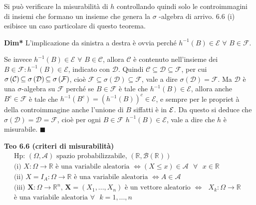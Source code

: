 \documentclass{article}
\begin{document}
Si pu\`{o} verificare la misurabilit\`{a} di $h$ controllando quindi solo le
controimmagini di insiemi che formano un insieme che genera la $\sigma $%
-algebra di arrivo. 6.6 (i) esibisce un caso particolare di questo teorema.

\textbf{Dim*} L'implicazione da sinistra a destra \`{e} ovvia perch\'{e} $%
h^{-1}\left( B\right) \in \mathcal{E}$ $\forall $ $B\in \mathcal{F}$.

Se invece $h^{-1}\left( B\right) \in \mathcal{E}$ $\forall $ $B\in \mathcal{C%
}$, allora $\mathcal{C}$ \`{e} contenuto nell'insieme dei $B\in \mathcal{F}%
:h^{-1}\left( B\right) \in \mathcal{E}$, indicato con $\mathcal{D}$. Quindi $%
\mathcal{C\subseteq D\subseteq F}$, per cui $\sigma \left( \mathcal{C}%
\right) \mathcal{\subseteq \sigma }\left( \mathcal{D}\right) \mathcal{%
\subseteq \sigma }\left( \mathcal{F}\right) $, cio\`{e} $\mathcal{F\subseteq
\sigma }\left( \mathcal{D}\right) \mathcal{\subseteq F}$, vale a dire $%
\mathcal{\sigma }\left( \mathcal{D}\right) =\mathcal{F}$. Ma $\mathcal{D}$ 
\`{e} una $\sigma $-algebra su $\mathcal{F}$ perch\'{e} se $B\in \mathcal{F}$
\`{e} tale che $h^{-1}\left( B\right) \in \mathcal{E}$, allora anche $%
B^{c}\in \mathcal{F}$ \`{e} tale che $h^{-1}\left( B^{c}\right) =\left(
h^{-1}\left( B\right) \right) ^{c}\in \mathcal{E}$, e sempre per le propriet%
\`{a} della controimmagine anche l'unione di $B$ siffatti \`{e} in $\mathcal{%
E}$. Da questo si deduce che $\mathcal{\sigma }\left( \mathcal{D}\right) =%
\mathcal{D}=\mathcal{F}$, cio\`{e} per ogni $B\in \mathcal{F}$ $h^{-1}\left(
B\right) \in \mathcal{E}$, vale a dire che $h$ \`{e} misurabile. $%
\blacksquare $

\textbf{Teo 6.6 (criteri di misurabilit\`{a})}%
\begin{gather*}
\text{Hp: }\left( \Omega ,\mathcal{A}\right) \text{ spazio probabilizzabile, 
}\left( 
\mathbb{R}
,\mathcal{B}\left( 
\mathbb{R}
\right) \right) \\
\text{(i) }X:\Omega \rightarrow 
\mathbb{R}
\text{ \`{e} una variabile aleatoria }\Longleftrightarrow \left( X\leq
x\right) \in \mathcal{A}\text{ }\forall \text{ }x\in 
\mathbb{R}
\\
\text{(ii) }X=I_{A}:\Omega \rightarrow 
\mathbb{R}
\text{ \`{e} una variabile aleatoria }\Longleftrightarrow A\in \mathcal{A} \\
\text{(iii) }\mathbf{X}:\Omega \rightarrow 
\mathbb{R}
^{n}\text{, }\mathbf{X}=\left( X_{1},...,X_{n}\right) \text{ \`{e} un
vettore aleatorio }\Longleftrightarrow \text{ }X_{k}:\Omega \rightarrow 
\mathbb{R}
\text{ } \\
\text{\`{e} una variabile aleatoria }\forall \text{ }k=1,...,n
\end{gather*}
\end{document}
